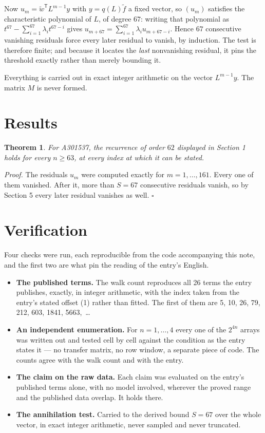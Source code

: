\documentclass[11pt]{article}
\newtheorem{theorem}{Theorem}
\theoremstyle{definition}
\begin{document}
Now $u_m = \tilde w^{\mathsf T} L^{m-1} y$ with $y = q(L)\tilde f$ a fixed vector, so $(u_m)$ satisfies the characteristic polynomial of $L$, of degree $67$: writing that polynomial as $t^{67} - \sum_{i=1}^{67} \lambda_i t^{67-i}$ gives $u_{m+67} = \sum_{i=1}^{67} \lambda_i u_{m+67-i}$. Hence $67$ consecutive vanishing residuals force every later residual to vanish, by induction. The test is therefore finite; and because it locates the {\itshape last} nonvanishing residual, it pins the threshold exactly rather than merely bounding it.

Everything is carried out in exact integer arithmetic on the vector $L^{m-1}y$. The matrix $M$ is never formed.

\section{Results}

\begin{theorem} For A301537, the recurrence of order $62$ displayed in Section 1 holds for every $n \ge 63$, at every index at which it can be stated.\end{theorem}

{\itshape Proof.} The residuals $u_m$ were computed exactly for $m = 1,\dots,161$. Every one of them vanished. After it, more than $S = 67$ consecutive residuals vanish, so by Section 5 every later residual vanishes as well. $\square$

\section{Verification}

Four checks were run, each reproducible from the code accompanying this note, and the first two are what pin the reading of the entry's English.

\begin{itemize}

\item {\bfseries The published terms.} The walk count reproduces all 26 terms the entry publishes, exactly, in integer arithmetic, with the index taken from the entry's stated offset (1) rather than fitted. The first of them are 5, 10, 26, 79, 212, 603, 1841, 5663,~\dots

\item {\bfseries An independent enumeration.} For $n = 1,\dots,4$ every one of the $2^{4n}$ arrays was written out and tested cell by cell against the condition as the entry states it --- no transfer matrix, no row window, a separate piece of code. The counts agree with the walk count and with the entry.

\item {\bfseries The claim on the raw data.} Each claim was evaluated on the entry's published terms alone, with no model involved, wherever the proved range and the published data overlap. It holds there.

\item {\bfseries The annihilation test.} Carried to the derived bound $S = 67$ over the whole vector, in exact integer arithmetic, never sampled and never truncated.

\end{itemize}
\end{document}
